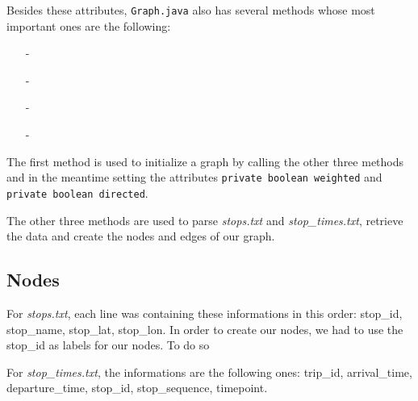 \documentclass{article}
\begin{document}
	Besides these attributes, \texttt{Graph.java} also has several methods whose most important ones are the following:

\begin{itemize}
\item[-]
\item[-]
\item[-]
\item[-]
\end{itemize}

\begingroup
\setlength{\rightskip}{0pt plus 1 fil}
The first method is used to initialize a graph by calling the other three methods and in the meantime setting the attributes \texttt{private boolean weighted} and \texttt{private boolean directed}.
\endgroup

The other three methods are used to parse \textit{stops.txt} and \textit{stop\_times.txt}, retrieve the data and create the nodes and edges of our graph.

\subsection{Nodes}

For \textit{stops.txt}, each line was containing these informations in this order: stop\_id, stop\_name, stop\_lat, stop\_lon. In order to create our nodes, we had to use the stop\_id as labels for our nodes. To do so 

For \textit{stop\_times.txt}, the informations are the following ones: trip\_id, arrival\_time, departure\_time, stop\_id, stop\_sequence, timepoint.
\end{document}
